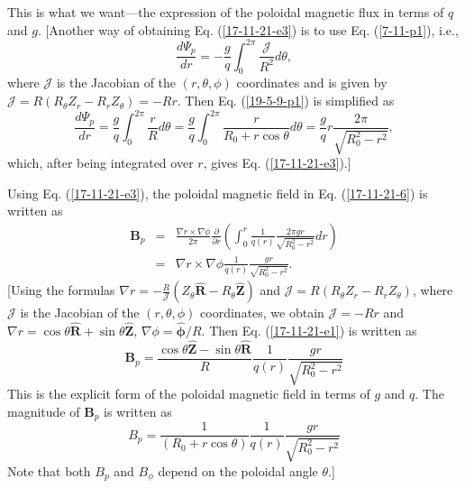 \documentclass{llncs}
\newcommand{\tmmathbf}[1]{\ensuremath{\boldsymbol{#1}}}
\begin{document}
This is what we want---the expression of the poloidal magnetic flux in terms
of $q$ and $g$. [Another way of obtaining Eq. (\ref{17-11-21-e3}) is to use
Eq. (\ref{7-11-p1}), i.e.,
\begin{equation}
  \label{19-5-9-p1} \frac{d \Psi_p}{d r} = - \frac{g}{q} \int_0^{2 \pi}
  \frac{\mathcal{J}}{R^2} d \theta,
\end{equation}
where $\mathcal{J}$ is the Jacobian of the $(r, \theta, \phi)$ coordinates and
is given by $\mathcal{J} = R (R_{\theta} Z_r - R_r Z_{\theta}) = - R r$. Then
Eq. (\ref{19-5-9-p1}) is simplified as
\begin{equation}
  \frac{d \Psi_p}{d r} = \frac{g}{q} \int_0^{2 \pi} \frac{r}{R } d \theta =
  \frac{g}{q} \int_0^{2 \pi} \frac{r}{R_0 + r \cos \theta } d \theta =
  \frac{g}{q} r \frac{2 \pi}{\sqrt{R_0^2 - r^2}},
\end{equation}
which, after being integrated over $r$, gives Eq. (\ref{17-11-21-e3}).]

Using Eq. (\ref{17-11-21-e3}), the poloidal magnetic field in Eq.
(\ref{17-11-21-6}) is written as
\begin{eqnarray}
  \mathbf{B}_p & = & \frac{\nabla r \times \nabla \phi}{2 \pi}
  \frac{\partial}{\partial r} \left( \int_0^r \frac{1}{q (r)}  \frac{2 \pi g
  r}{\sqrt{R_0^2 - r^2}} d r \right) \nonumber\\
  & = & \nabla r \times \nabla \phi \frac{1}{q (r)}  \frac{g r}{\sqrt{R_0^2 -
  r^2}} .  \label{17-11-21-e1}
\end{eqnarray}
[Using the formulas $\nabla r = - \frac{R}{\mathcal{J}} (Z_{\theta}
\hat{\mathbf{R}} - R_{\theta} \hat{\mathbf{Z}})$ and $\mathcal{J} = R
(R_{\theta} Z_r - R_r Z_{\theta})$, where $\mathcal{J}$ is the Jacobian of the
$(r, \theta, \phi)$ coordinates, we obtain $\mathcal{J} = - R r$ and $\nabla r
= \cos \theta \hat{\mathbf{R}} + \sin \theta \hat{\mathbf{Z}}$, $\nabla \phi =
\hat{\tmmathbf{\phi}} / R$. Then Eq. (\ref{17-11-21-e1}) is written as
\begin{equation}
  \mathbf{B}_p = \frac{\cos \theta \hat{\mathbf{Z}} - \sin \theta
  \hat{\mathbf{R}}}{R}  \frac{1}{q (r)}  \frac{g r}{\sqrt{R_0^2 - r^2}}
\end{equation}
This is the explicit form of the poloidal magnetic field in terms of $g$ and
$q$. The magnitude of $\mathbf{B}_p$ is written as
\begin{equation}
  B_p = \frac{1}{(R_0 + r \cos \theta)}  \frac{1}{q (r)}  \frac{g
  r}{\sqrt{R_0^2 - r^2}}
\end{equation}
Note that both $B_p$ and $B_{\phi}$ depend on the poloidal angle $\theta$.]
\end{document}
